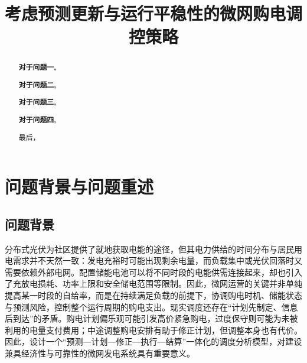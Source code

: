 \documentclass[withoutpreface,bwprint]{cumcmthesis}
\title{考虑预测更新与运行平稳性的微网购电调控策略}  %
\begin{document}
	
\maketitle
\begin{abstract}


\textbf{对于问题一,}

\textbf{对于问题二,}

\textbf{对于问题三,}

\textbf{对于问题四,}

最后，




\end{abstract}













\begingroup
\renewcommand{\baselinestretch}{1.12}\selectfont
\titlespacing*{\section}{0pt}{10pt}{10pt}
\titlespacing*{\subsection}{0pt}{8pt}{5pt}

\section{问题背景与问题重述}
\subsection{问题背景}
分布式光伏为社区提供了就地获取电能的途径，但其电力供给的时间分布与居民用电需求并不天然一致：发电充裕时可能出现剩余电量，而负载集中或光伏回落时又需要依赖外部电网。配置储能电池可以将不同时段的电能供需连接起来，却也引入了充放电损耗、功率上限和安全储电范围等限制。因此，微网运营的关键并非单纯提高某一时段的自给率，而是在持续满足负载的前提下，协调购电时机、储能状态与预测风险，控制整个运行周期的购电支出。现实调度还存在“计划先制定、信息后到达”的矛盾。购电计划偏乐观可能引发高价紧急购电，过度保守则可能为未被利用的电量支付费用；中途调整购电安排有助于修正计划，但调整本身也有代价。因此，设计一个“预测—计划—修正—执行—结算”一体化的调度分析模型，对建设兼具经济性与可靠性的微网发电系统具有重要意义。
\end{document}
